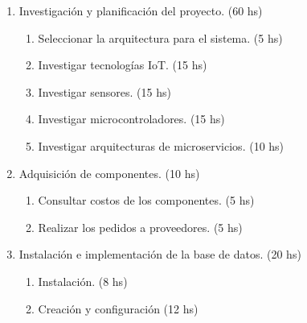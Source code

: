 \documentclass[
11pt, %
]{charter}
\begin{document}
\begin{enumerate}
\item Investigación y planificación del proyecto. (60 hs)
	\begin{enumerate}
	\item Seleccionar la arquitectura para el sistema. (5 hs)
	\item Investigar tecnologías IoT. (15 hs)
	\item Investigar sensores. (15 hs)
	\item Investigar microcontroladores. (15 hs)
	\item Investigar arquitecturas de microservicios. (10 hs)
	\end{enumerate}
\item Adquisición de componentes. (10 hs)
	\begin{enumerate}
	\item Consultar costos de los componentes. (5 hs)
	\item Realizar los pedidos a proveedores. (5 hs)
	\end{enumerate}
\item Instalación e implementación de la base de datos. (20 hs)
	\begin{enumerate}
	\item Instalación. (8 hs)
	\item Creación y configuración (12 hs)


\end{enumerate}
\end{enumerate}
\end{document}

